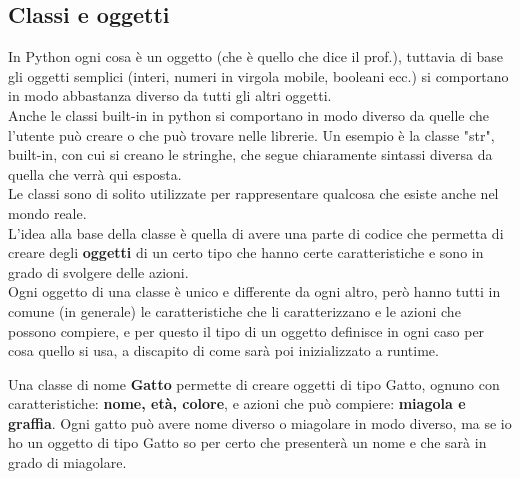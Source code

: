 \documentclass[10pt]{extarticle}
\newcommand{\<}{\langle}
\renewcommand{\>}{\rangle}
\theoremstyle{mystyle}{\newtheorem*{remark}{Nota}}
\theoremstyle{mystyle}{\newtheorem*{remarks}{Note}}
\theoremstyle{mystyle}{\newtheorem*{example}{Esempio}}
\theoremstyle{mystyle}{\newtheorem*{examples}{Esempi}}
\theoremstyle{definition}{\newtheorem*{exercise}{Exercise}}
\theoremstyle{warn}
\begin{document}
\subsection{Classi e oggetti}
In Python ogni cosa è un oggetto (che è quello che dice il prof.), tuttavia di base gli oggetti semplici (interi, numeri in virgola mobile, booleani ecc.) si comportano in modo abbastanza diverso da tutti gli altri oggetti.\\
Anche le classi built-in in python si comportano in modo diverso da quelle che l'utente può creare o che può trovare nelle librerie. Un esempio è la classe "str", built-in, con cui si creano le stringhe, che segue chiaramente sintassi diversa da quella che verrà qui esposta.\\
Le classi sono di solito utilizzate per rappresentare qualcosa che esiste anche nel mondo reale.\\
L'idea alla base della classe è quella di avere una parte di codice che permetta di creare degli \textbf{oggetti} di un certo tipo che hanno certe caratteristiche e sono in grado di svolgere delle azioni.\\
Ogni oggetto di una classe è unico e differente da ogni altro, però hanno tutti in comune (in generale) le caratteristiche che li caratterizzano e le azioni che possono compiere, e per questo il tipo di un oggetto definisce in ogni caso per cosa quello si usa, a discapito di come sarà poi inizializzato a runtime.
\begin{example}
Una classe di nome \textbf{Gatto} permette di creare oggetti di tipo Gatto, ognuno con caratteristiche: \textbf{nome, età, colore}, e azioni che può compiere: \textbf{miagola e graffia}. Ogni gatto può avere nome diverso o miagolare in modo diverso, ma se io ho un oggetto di tipo Gatto so per certo che presenterà un nome e che sarà in grado di miagolare.
\end{example}
\end{document}
